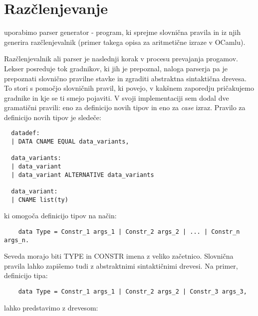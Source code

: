 \documentclass[12pt,a4paper,openany]{book}
\begin{document}
\section{Razčlenjevanje}
uporabimo parser generator - program, ki sprejme slovnična pravila in iz njih generira razčlenjevalnik (primer takega opisa za aritmetične izraze v OCamlu).


Razčlenjevalnik ali parser je naslednji korak v procesu prevajanja progamov. Lekser posreduje tok gradnikov, ki jih je prepoznal, naloga parserja pa je prepoznati slovnično
pravilne stavke in zgraditi abstraktna sintaktična drevesa. To stori s pomočjo slovničnih pravil, ki povejo, v kakšnem zaporedju pričakujemo 
gradnike in kje se ti smejo pojaviti. V svoji implementaciji sem dodal dve gramatični pravili: eno za definicijo novih tipov in eno za \emph{case}
izraz. Pravilo za definicijo novih tipov je sledeče:
\begin{lstlisting}
  datadef:
  | DATA CNAME EQUAL data_variants,

  data_variants:
  | data_variant
  | data_variant ALTERNATIVE data_variants

  data_variant:
  | CNAME list(ty)
\end{lstlisting}
ki omogoča definicijo tipov na način:
\begin{lstlisting}
    data Type = Constr_1 args_1 | Constr_2 args_2 | ... | Constr_n args_n.
\end{lstlisting}
Seveda morajo biti TYPE in CONSTR imena z veliko začetnico. Slovnična pravila lahko zapišemo tudi z abstraktnimi sintaktičnimi drevesi. Na primer, 
definicijo tipa:
\begin{lstlisting}
	data Type = Constr_1 args_1 | Constr_2 args_2 | Constr_3 args_3,
\end{lstlisting}
lahko predstavimo z drevesom:
\begin{center}
\end{center}
\end{document}
